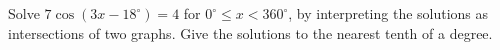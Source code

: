 Solve $7\cos(3x-18^\circ)=4$ for $0^\circ\le x<360^\circ$, by interpreting the solutions as intersections of two graphs. Give the solutions to the nearest tenth of a degree.
